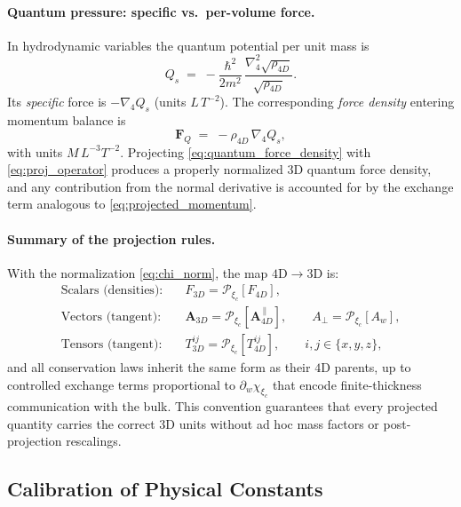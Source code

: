 \paragraph{Quantum pressure: specific vs.\ per-volume force.}
In hydrodynamic variables the quantum potential per unit mass is
\begin{equation}
Q_s\;=\;-\frac{\hbar^2}{2m^2}\,\frac{\nabla_4^2\sqrt{\rho_{4D}}}{\sqrt{\rho_{4D}}}.
\label{eq:quantum_potential_specific}
\end{equation}
Its \emph{specific} force is $-\nabla_4 Q_s$ (units $L\,T^{-2}$). The corresponding \emph{force density} entering momentum balance is
\begin{equation}
\mathbf{F}_Q\;=\;-\rho_{4D}\,\nabla_4 Q_s,
\label{eq:quantum_force_density}
\end{equation}
with units $M\,L^{-3}T^{-2}$. Projecting \eqref{eq:quantum_force_density} with \eqref{eq:proj_operator} produces a properly normalized $3$D quantum force density, and any contribution from the normal derivative is accounted for by the exchange term analogous to \eqref{eq:projected_momentum}.

\paragraph{Summary of the projection rules.}
With the normalization \eqref{eq:chi_norm}, the map $4$D$\to 3$D is:
\begin{align}
\text{Scalars (densities):}\quad & F_{3D}=\mathcal{P}_{\xi_c}[F_{4D}],\\
\text{Vectors (tangent):}\quad & \mathbf{A}_{3D}=\mathcal{P}_{\xi_c}[\mathbf{A}^{\,\parallel}_{4D}],\qquad
A_{\perp}=\mathcal{P}_{\xi_c}[A_w],\\
\text{Tensors (tangent):}\quad & T^{ij}_{3D}=\mathcal{P}_{\xi_c}[T^{ij}_{4D}],\qquad i,j\in\{x,y,z\},
\end{align}
and all conservation laws inherit the same form as their $4$D parents, up to controlled exchange terms proportional to $\partial_w\chi_{\xi_c}$ that encode finite-thickness communication with the bulk. This convention guarantees that every projected quantity carries the correct $3$D units without ad hoc mass factors or post-projection rescalings.

\subsection{Calibration of Physical Constants}

